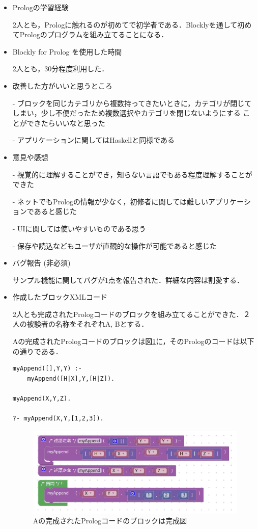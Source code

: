 \documentclass{risepaper}
\begin{document}
\begin{itemize}
\item Prologの学習経験

2人とも，Prologに触れるのが初めてで初学者である．Blocklyを通して初めてPrologのプログラムを組み立てることになる．

\item Blockly for Prolog を使用した時間

2人とも，30分程度利用した．

\item 改善した方がいいと思うところ

- ブロックを同じカテゴリから複数持ってきたいときに，カテゴリが閉じてしまい，少し不便だったため複数選択やカテゴリを閉じないようにする
ことができたらいいなと思った

- アプリケーションに関してはHaskellと同様である

\item 意見や感想

- 視覚的に理解することができ，知らない言語でもある程度理解することができた

- ネットでもPrologの情報が少なく，初修者に関しては難しいアプリケーションであると感じた

- UIに関しては使いやすいものである思う

- 保存や読込などもユーザが直観的な操作が可能であると感じた

\item バグ報告 (非必須)

サンプル機能に関してバグが1点を報告された．詳細な内容は割愛する．

\item 作成したブロックXMLコード

2人とも完成されたPrologコードのブロックを組み立てることができた．２人の被験者の名称をそれぞれA, Bとする．

Aの完成されたPrologコードのブロックは図\ref{fig:prolog_experiment_result_a}に，そのPrologのコードは以下の通りである．
\begin{lstlisting}[basicstyle=\ttfamily\footnotesize]
myAppend([],Y,Y) :-
    myAppend([H|X],Y,[H|Z]).

myAppend(X,Y,Z).

?- myAppend(X,Y,[1,2,3]).
\end{lstlisting}

\begin{figure}[h]
\begin{center}
\includegraphics[scale=0.5]{img/prolog_experiment_result_a.PNG}
\caption{Aの完成されたPrologコードのブロックは完成図}%
\label{fig:prolog_experiment_result_a}
\end{center}%
\end{figure}%


\end{itemize}
\end{document}
